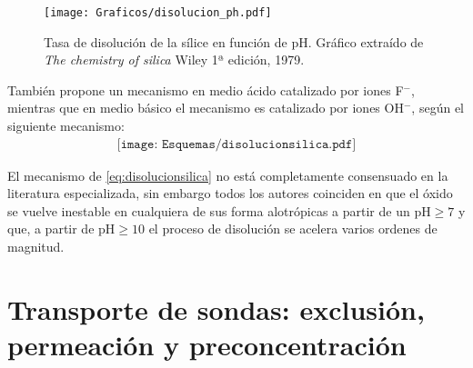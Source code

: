 			\begin{figure}[th!]
			\centering
 	       	\texttt{[image: Graficos/disolucion\_ph.pdf]}
	       		\caption[Tasa de disolución sílice en función del pH]{Tasa de disolución de la sílice en función de pH. Gráfico extraído de \textit{The chemistry of silica} Wiley 1ª edición, 1979.\cite{iler1979}}
	         	\label{fig:disolucion_ph}
	     		\end{figure}
	
	También propone un mecanismo en medio ácido catalizado por iones F$^-$, mientras que en medio básico el mecanismo es catalizado por iones OH$^-$, según el siguiente mecanismo:
			\begin{equation}
				\begin{aligned}
				\texttt{[image: Esquemas/disolucionsilica.pdf]}
				\label{eq:disolucionsilica}
				\end{aligned}
				\end{equation} 
	
	El mecanismo de \ref{eq:disolucionsilica} no está completamente consensuado en la literatura especializada, sin embargo todos los autores coinciden en que el óxido se vuelve inestable en cualquiera de sus forma alotrópicas a partir de un $\text{pH}\geq7$ y que, a partir de $\text{pH}\geq10$ el proceso de disolución se acelera varios ordenes de magnitud.\cite{Kosmulski2002,Kosmulski2014,Schwarz1984,Si-HanWu2013,iler1979}

	
				

\section{Transporte de sondas: exclusión, permeación y preconcentración}

